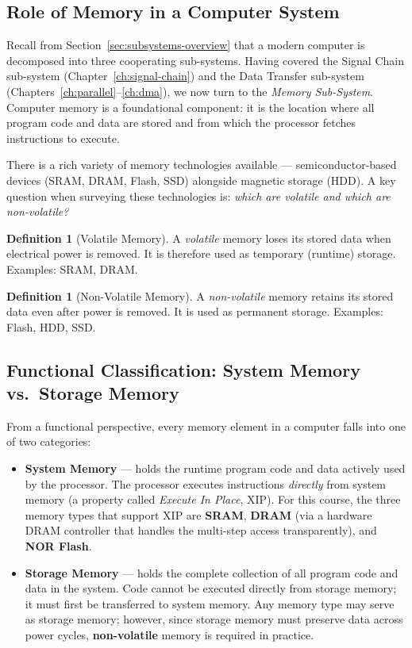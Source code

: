\documentclass[11pt, a4paper, notitlepage]{report}
\theoremstyle{definition}
\newtheorem{definition}[theorem]{Definition}
\theoremstyle{remark}
\theoremstyle{definition}
\begin{document}
\subsection{Role of Memory in a Computer System}
\label{sec:memory-role}

Recall from Section~\ref{sec:subsystems-overview} that a modern computer is decomposed into three cooperating sub-systems. Having covered the Signal Chain sub-system (Chapter~\ref{ch:signal-chain}) and the Data Transfer sub-system (Chapters~\ref{ch:parallel}–\ref{ch:dma}), we now turn to the \emph{Memory Sub-System}. Computer memory is a foundational component: it is the location where all program code and data are stored and from which the processor fetches instructions to execute.

There is a rich variety of memory technologies available — semiconductor-based devices (SRAM, DRAM, Flash, SSD) alongside magnetic storage (HDD). A key question when surveying these technologies is: \emph{which are volatile and which are non-volatile?}

\begin{definition}[Volatile Memory]
  \label{def:volatile}
  A \emph{volatile} memory loses its stored data when electrical power is removed. It is therefore used as temporary (runtime) storage. Examples: SRAM, DRAM.
\end{definition}

\begin{definition}[Non-Volatile Memory]
  \label{def:nonvolatile}
  A \emph{non-volatile} memory retains its stored data even after power is removed. It is used as permanent storage. Examples: Flash, HDD, SSD.
\end{definition}

\subsection{Functional Classification: System Memory vs.\ Storage Memory}
\label{sec:system-vs-storage}

From a functional perspective, every memory element in a computer falls into one of two categories:

\begin{itemize}
  \item \textbf{System Memory} — holds the runtime program code and data actively used by the processor. The processor executes instructions \emph{directly} from system memory (a property called \emph{Execute In Place}, XIP). For this course, the three memory types that support XIP are \textbf{SRAM}, \textbf{DRAM} (via a hardware DRAM controller that handles the multi-step access transparently), and \textbf{NOR Flash}.
  \item \textbf{Storage Memory} — holds the complete collection of all program code and data in the system. Code cannot be executed directly from storage memory; it must first be transferred to system memory. Any memory type may serve as storage memory; however, since storage memory must preserve data across power cycles, \textbf{non-volatile} memory is required in practice.
\end{itemize}
\end{document}
